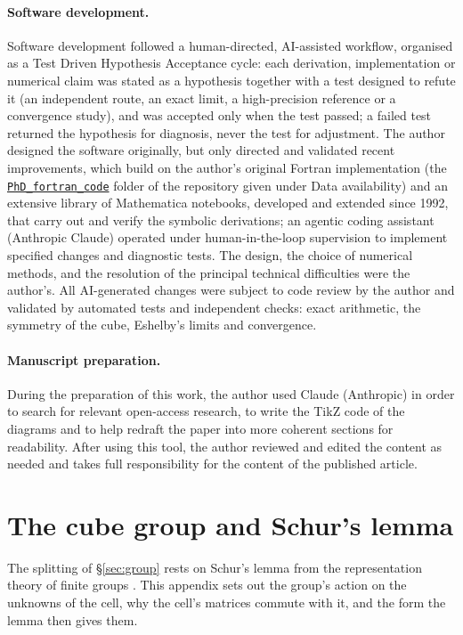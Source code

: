 \documentclass[11pt,a4paper]{article}
\begin{document}
\paragraph{Software development.} Software development followed a human-directed, AI-assisted
workflow, organised as a Test Driven Hypothesis Acceptance cycle: each derivation, implementation or
numerical claim was stated as a hypothesis together with a test designed to refute it (an independent
route, an exact limit, a high-precision reference or a convergence study), and was accepted only when
the test passed; a failed test returned the hypothesis for diagnosis, never the test for adjustment. The author designed the software originally, but only directed and validated recent
improvements, which build on the author's original Fortran implementation (the
\href{https://github.com/tmnestor/MultipleScatteringCalculations/tree/main/PhD_fortran_code}{\texttt{PhD\_fortran\_code}}
folder of the repository given under Data availability) and an extensive library of Mathematica notebooks,
developed and extended since 1992, that carry out and verify the symbolic derivations; an agentic coding
assistant (Anthropic Claude) operated under human-in-the-loop supervision to implement specified changes and
diagnostic tests. The design, the choice of numerical methods, and the resolution of the principal
technical difficulties were the author's. All AI-generated changes were subject to code review by the
author and validated by automated tests and independent checks: exact arithmetic, the symmetry of the
cube, Eshelby's limits and convergence.

\paragraph{Manuscript preparation.} During the preparation of this work, the author used Claude
(Anthropic) in order to search for relevant open-access research, to write the TikZ code of the diagrams
and to help redraft the paper into more coherent sections for readability. After using this tool, the
author reviewed and edited the content as needed and takes full responsibility for the content of the
published article.

\appendix

\section{The cube group and Schur's lemma}\label{app:group}

The splitting of \S\ref{sec:group} rests on Schur's lemma from the representation theory of finite groups
\citep{Tinkham1964,Dresselhaus2008}. This appendix sets out the group's action on the unknowns of the cell,
why the cell's matrices commute with it, and the form the lemma then gives them.
\end{document}
